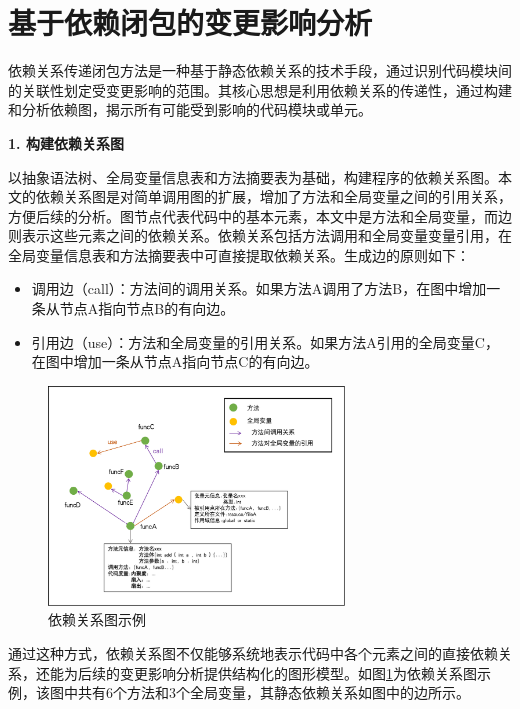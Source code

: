 \section{基于依赖闭包的变更影响分析}

依赖关系传递闭包方法是一种基于静态依赖关系的技术手段，通过识别代码模块间的关联性划定受变更影响的范围\cite{2021Improving}。其核心思想是利用依赖关系的传递性，通过构建和分析依赖图，揭示所有可能受到影响的代码模块或单元。

\noindent \textbf{1. 构建依赖关系图}
\label{1_代码依赖图}



以抽象语法树、全局变量信息表和方法摘要表为基础，构建程序的依赖关系图。本文的依赖关系图是对简单调用图的扩展，增加了方法和全局变量之间的引用关系，方便后续的分析。图节点代表代码中的基本元素，本文中是方法和全局变量，而边则表示这些元素之间的依赖关系。依赖关系包括方法调用和全局变量变量引用，在全局变量信息表和方法摘要表中可直接提取依赖关系。生成边的原则如下：
\begin{itemize}
    \item 调用边（call）：方法间的调用关系。如果方法A调用了方法B，在图中增加一条从节点A指向节点B的有向边。
    
    \item 引用边（use）：方法和全局变量的引用关系。如果方法A引用的全局变量C，在图中增加一条从节点A指向节点C的有向边。
\end{itemize}


\begin{figure}[htbp]
    \centering
    \includegraphics[width = 0.7\textwidth]{figures/依赖关系图.png}
    \caption{依赖关系图示例}
    \label{1_依赖图示例}
    \end{figure}


通过这种方式，依赖关系图不仅能够系统地表示代码中各个元素之间的直接依赖关系，还能为后续的变更影响分析提供结构化的图形模型。如图\ref{1_依赖图示例}为依赖关系图示例，该图中共有6个方法和3个全局变量，其静态依赖关系如图中的边所示。


